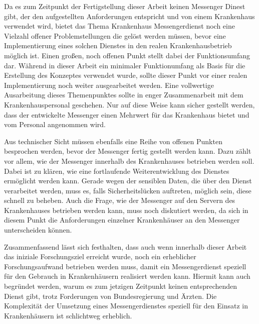 Da es zum Zeitpunkt der Fertigstellung dieser Arbeit keinen Messenger Dinest gibt, der den aufgestellten Anforderungen entspricht und von einem Krankenhaus verwendet wird, bietet das Thema Krankenhaus Messengerdienst noch eine Vielzahl offener Problemstellungen die gelöst werden müssen, bevor eine Implementierung eines solchen Dienstes in den realen Krankenhausbetrieb möglich ist.
Einen großen, noch offenen Punkt stellt dabei der Funktionsumfang dar. Während in dieser Arbeit ein minimaler Funktionumfang als Basis für die Erstellung des Konzeptes verwendet wurde, sollte dieser Punkt vor einer realen Implementierung noch weiter ausgearbeitet werden. Eine vollwertige Ausarbeitung dieses Themenpunktes sollte in enger Zusammenarbeit mit dem Krankenhauspersonal geschehen. Nur auf diese Weise kann sicher gestellt werden, dass der entwickelte Messenger einen Mehrwert für das Krankenhaus bietet und vom Personal angenommen wird.

Aus technischer Sicht müssen ebenfalls eine Reihe von offenen Punkten besprochen werden, bevor der Messenger fertig gestellt werden kann.
Dazu zählt vor allem, wie der Messenger innerhalb des Krankenhauses betrieben werden soll. Dabei ist zu klären, wie eine fortlaufende Weiterentwicklung des Dienstes ermöglicht werden kann. Gerade wegen der sensiblen Daten, die über den Dienst verarbeitet werden, muss es, falls Sicherheitslücken auftreten, möglich sein, diese schnell zu beheben. Auch die Frage, wie der Messenger auf den Servern des Krankenhauses betrieben werden kann, muss noch diskutiert werden, da sich in diesem Punkt die Anforderungen einzelner Krankenhäuser an den Messenger unterscheiden können.

Zusammenfassend lässt sich festhalten, dass auch wenn innerhalb dieser Arbeit das iniziale Forschungsziel erreicht wurde, noch ein erheblicher Forschungsaufwand betrieben werden muss, damit ein Messengerdienst speziell für den Gebrauch in Krankenhäusern realisiert werden kann. Hiermit kann auch begründet werden, warum es zum jetzigen Zeitpunkt keinen entsprechenden Dienst gibt, trotz Forderungen von Bundesregierung und Ärzten. Die Komplexität der Umsetzung eines Messengerdienstes speziell für den Einsatz in Krankenhäusern ist schlichtweg erheblich.

